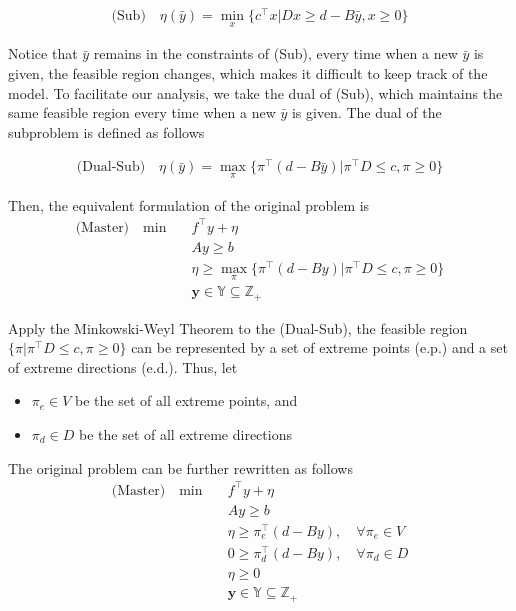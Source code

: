             \begin{align*}
                \text{(Sub)} \quad \eta(\bar{y}) = \min_x \{c^\top x | D x \ge d - B \bar{y}, x \ge 0\}
            \end{align*}

            Notice that $\bar{y}$ remains in the constraints of (Sub), every time when a new $\bar{y}$ is given, the feasible region changes, which makes it difficult to keep track of the model. To facilitate our analysis, we take the dual of (Sub), which maintains the same feasible region every time when a new $\bar{y}$ is given. The dual of the subproblem is defined as follows

            \begin{align*}
                \text{(Dual-Sub)} \quad \eta(\bar{y}) = \max_{\pi} \{\pi^\top (d - B\bar{y})| \pi^\top D \le c, \pi \ge 0\}
            \end{align*}

            Then, the equivalent formulation of the original problem is
            \begin{align*}
                \text{(Master)} \quad \min \quad & f^\top y + \eta\\
                & Ay \ge b\\
                & \eta \ge \max_\pi \{\pi^\top (d - By) | \pi^\top D \le c, \pi \ge 0\}\\
                & \mathbf{y} \in \mathbb{Y} \subseteq \mathbb{Z}_+
            \end{align*}

            Apply the Minkowski-Weyl Theorem to the (Dual-Sub), the feasible region $\{\pi|\pi^\top D \le c, \pi \ge 0\}$ can be represented by a set of extreme points (e.p.) and a set of extreme directions (e.d.). Thus, let

            \begin{itemize}
                \item $\pi_e \in V$ be the set of all extreme points, and 
                \item $\pi_d \in D$ be the set of all extreme directions
            \end{itemize}

            The original problem can be further rewritten as follows
            \begin{align*}
                \text{(Master)} \quad \min \quad & f^\top y + \eta\\
                & Ay \ge b\\
                & \eta \ge \pi_e^\top (d - By), \quad \forall \pi_e \in V\\
                & 0 \ge \pi_d^\top (d - By), \quad \forall \pi_d \in D\\
                & \eta \ge 0\\
                & \mathbf{y} \in \mathbb{Y} \subseteq \mathbb{Z}_+
            \end{align*}

